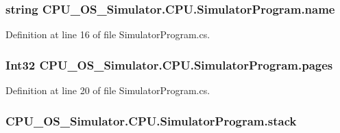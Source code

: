 \subsubsection[{name}]{\setlength{\rightskip}{0pt plus 5cm}string C\+P\+U\+\_\+\+O\+S\+\_\+\+Simulator.\+C\+P\+U.\+Simulator\+Program.\+name\hspace{0.3cm}{\ttfamily [private]}}\label{class_c_p_u___o_s___simulator_1_1_c_p_u_1_1_simulator_program_ad4797b5d81ceb01cd4207a97b7af36c5}


Definition at line 16 of file Simulator\+Program.\+cs.

\hypertarget{class_c_p_u___o_s___simulator_1_1_c_p_u_1_1_simulator_program_ac4d19d17c7ee206ad6343884f3390054}{}
\subsubsection[{pages}]{\setlength{\rightskip}{0pt plus 5cm}Int32 C\+P\+U\+\_\+\+O\+S\+\_\+\+Simulator.\+C\+P\+U.\+Simulator\+Program.\+pages\hspace{0.3cm}{\ttfamily [private]}}\label{class_c_p_u___o_s___simulator_1_1_c_p_u_1_1_simulator_program_ac4d19d17c7ee206ad6343884f3390054}


Definition at line 20 of file Simulator\+Program.\+cs.

\hypertarget{class_c_p_u___o_s___simulator_1_1_c_p_u_1_1_simulator_program_a85f44af349486db4b141b3946bf21a64}{}
\subsubsection[{stack}]{ C\+P\+U\+\_\+\+O\+S\+\_\+\+Simulator.\+C\+P\+U.\+Simulator\+Program.\+stack\hspace{0.3cm}{\ttfamily [private]}}\label{class_c_p_u___o_s___simulator_1_1_c_p_u_1_1_simulator_program_a85f44af349486db4b141b3946bf21a64}



